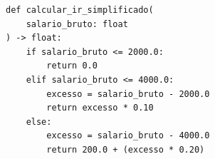 \ifmostrarGabarito
\begin{verbatim}
def calcular_ir_simplificado(
    salario_bruto: float
) -> float:
    if salario_bruto <= 2000.0:
        return 0.0
    elif salario_bruto <= 4000.0:
        excesso = salario_bruto - 2000.0
        return excesso * 0.10
    else:
        excesso = salario_bruto - 4000.0
        return 200.0 + (excesso * 0.20)
\end{verbatim}

\fi
